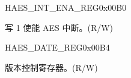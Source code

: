 \begin{register}{H}{AES\_INT\_ENA\_REG}{0x00B0}\label{regdesc:AESINTENAREG}
%
%
\regnewline%
\begin{regdesc}\begin{reglist}
\item [AES\_INT\_ENA] 写 1 使能 AES 中断。(R/W)
\end{reglist}\end{regdesc}
\end{register}

\begin{register}{H}{AES\_DATE\_REG}{0x00B4}\label{regdesc:AESDATEREG}
%
%
\regnewline%
\begin{regdesc}\begin{reglist}
\label{fielddesc:AESDATE}\item [AES\_DATE] 版本控制寄存器。(R/W)
\end{reglist}\end{regdesc}
\end{register}
